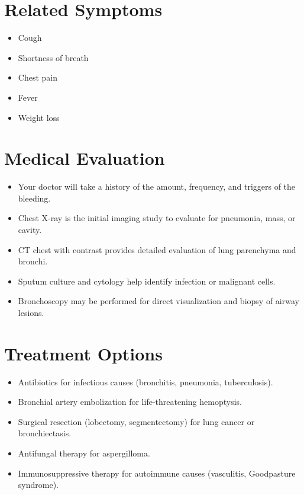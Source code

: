 \section*{Related Symptoms}
\begin{itemize}
  \item Cough
  \item Shortness of breath
  \item Chest pain
  \item Fever
  \item Weight loss
\end{itemize}

\section*{Medical Evaluation}
\begin{itemize}
  \item Your doctor will take a history of the amount, frequency, and triggers of the bleeding.
  \item Chest X-ray is the initial imaging study to evaluate for pneumonia, mass, or cavity.
  \item CT chest with contrast provides detailed evaluation of lung parenchyma and bronchi.
  \item Sputum culture and cytology help identify infection or malignant cells.
  \item Bronchoscopy may be performed for direct visualization and biopsy of airway lesions.
\end{itemize}

\section*{Treatment Options}
\begin{itemize}
  \item Antibiotics for infectious causes (bronchitis, pneumonia, tuberculosis).
  \item Bronchial artery embolization for life-threatening hemoptysis.
  \item Surgical resection (lobectomy, segmentectomy) for lung cancer or bronchiectasis.
  \item Antifungal therapy for aspergilloma.
  \item Immunosuppressive therapy for autoimmune causes (vasculitis, Goodpasture syndrome).
\end{itemize}

